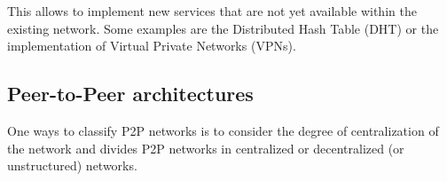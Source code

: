 This allows to implement new services that are not yet available within the existing network. Some examples are the Distributed Hash Table (DHT) or the implementation of Virtual Private Networks (VPNs). 




\subsection{Peer-to-Peer architectures}
One ways to classify P2P networks is to consider the degree of centralization of the network and divides P2P networks in centralized or decentralized (or unstructured) networks.
\\


